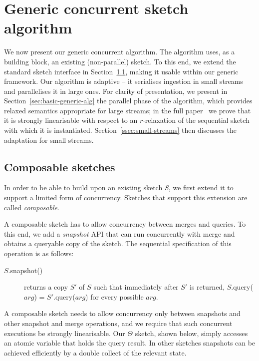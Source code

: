 \section{Generic concurrent sketch algorithm}
\label{sec:genericAlg}

We now present our generic concurrent  algorithm. 
The algorithm uses, as a building block, an existing (non-parallel) sketch. 
To this end, we extend the standard sketch interface in Section~\ref{sec:composable-sketches}, 
making it usable within our generic framework.  
Our algorithm is adaptive -- it serialises ingestion in small streams and parallelises it in large ones.
For clarity of presentation, we  present in Section~\ref{sec:basic-generic-alg} the parallel phase of the algorithm, which provides relaxed semantics appropriate for large streams;  
in the full paper~\cite{rinberg2019fast}
we prove that it is strongly linearisable
with respect to an $r$-relaxation of the sequential sketch with which it is instantiated.
Section~\ref{ssec:small-streams} then discusses the adaptation for small streams.


\subsection{Composable sketches}
\label{sec:composable-sketches}

In order to be able to build upon an existing sketch \emph{S},
we first extend it to support a limited form of concurrency.
Sketches that support this extension are called \emph{composable}.

A composable sketch has to allow concurrency between merges and queries.
To this end, we add a \emph{snapshot} API that can run concurrently with merge and
obtains a queryable copy of the sketch. The sequential specification of this operation is as follows:
\begin{description}
    \item[$S$.snapshot()] returns a copy $S'$ of $S$ such that immediately after $S'$ is returned,
     $S$.query($arg$) = $S'$.query($arg$) for every possible $arg$.
\end{description}

A composable sketch needs to allow concurrency only between snapshots
and other snapshot and merge operations, and we require that such concurrent
executions be strongly linearisable. Our $\Theta$ sketch, shown below,
simply accesses an atomic variable that holds the query result. In other sketches
snapshots can be achieved efficiently by a double collect of the relevant state.

